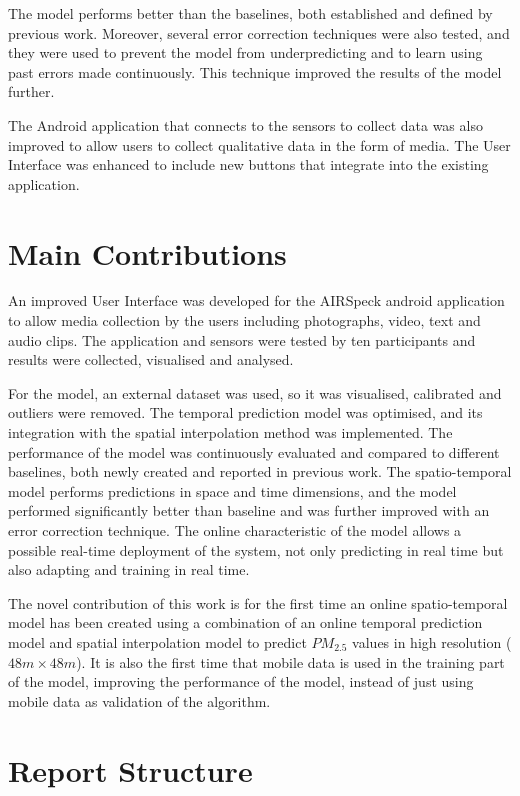 The model performs better than the baselines, both established and defined by previous work. Moreover, several error correction techniques were also tested, and they were used to prevent the model from underpredicting and to learn using past errors made continuously. This technique improved the results of the model further.

The Android application that connects to the sensors to collect data was also improved to allow users to collect qualitative data in the form of media. The User Interface was enhanced to include new buttons that integrate into the existing application.

\section{Main Contributions}

An improved User Interface was developed for the AIRSpeck android application to allow media collection by the users including photographs, video, text and audio clips. The application and sensors were tested by ten participants and results were collected, visualised and analysed.

For the model, an external dataset was used, so it was visualised, calibrated and outliers were removed. The temporal prediction model was optimised, and its integration with the spatial interpolation method was implemented. The performance of the model was continuously evaluated and compared to different baselines, both newly created and reported in previous work.
The spatio-temporal model performs predictions in space and time dimensions, and the model performed significantly better than baseline and was further improved with an error correction technique. The online characteristic of the model allows a possible real-time deployment of the system, not only predicting in real time but also adapting and training in real time.

The novel contribution of this work is for the first time an online spatio-temporal model has been created using a combination of an online temporal prediction model and spatial interpolation model to predict $PM_{2.5}$ values in high resolution ($48m \times 48m$). It is also the first time that mobile data is used in the training part of the model, improving the performance of the model, instead of just using mobile data as validation of the algorithm.

\section{Report Structure}

